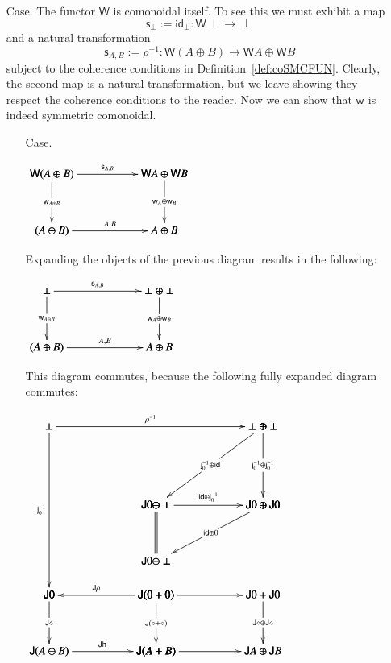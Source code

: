 \documentclass{lmcs}
\let\mto\to
\let\to\relax
\newcommand{\to}{\rightarrow}
\let\r\relax
\let\j\relax
\let\wn\relax
\let\H\relax
\newcommand{\func}[1]{\mathsf{#1}}
\newcommand{\H}[0]{\func{H}}
\newcommand{\J}[0]{\func{J}}
\newcommand{\id}[0]{\mathsf{id}}
\newcommand{\h}[1]{\mathsf{h}_{#1}}
\newcommand{\r}[1]{\mathsf{r}_{#1}}
\newcommand{\s}[1]{\mathsf{s}_{#1}}
\newcommand{\w}[1]{\mathsf{w}_{#1}}
\newcommand{\j}[1]{\mathsf{j}_{#1}}
\newcommand{\jinv}[1]{\mathsf{j}^{-1}_{#1}}
\newcommand{\wn}[0]{\mathop{?}}
\newenvironment{diagram}{
  \begin{center}
    \begin{math}
      \bfig
}{
      \efig
    \end{math}
  \end{center}
}
\begin{document}
\begin{itemize}
\item[Case.] The functor $\func{W}$ is comonoidal itself.  To see this we
  must exhibit a map
  \[\s{\perp} := \id_\perp : \func{W}\perp \mto \perp\]
  and a natural transformation
  \[\s{A,B} := \rho^{-1}_\perp : \func{W}(A \oplus B) \mto \func{W}A \oplus \func{W}B\]
  subject to the coherence conditions in
  Definition~\ref{def:coSMCFUN}.  Clearly, the second map is a natural
  transformation, but we leave showing they respect the coherence
  conditions to the reader.  Now we can show that $\w{}$ is indeed
  symmetric comonoidal.
  \begin{itemize}
  \item[Case.] \ \\
    \begin{diagram}
      \square|amma|<1000,500>[
        \func{W}(A \oplus B)`
        \func{W}A \oplus \func{W}B`
        \wn (A \oplus B)`
        \wn A \oplus \wn B;
        \s{A,B}`
        \w{A \oplus B}`
        \w{A} \oplus \w{B}`
        \r{A,B}]
    \end{diagram}
    Expanding the objects of the previous diagram results in the
    following:
    \begin{diagram}
      \square|amma|<1000,500>[
        \perp`
        \perp \oplus \perp`
        \wn (A \oplus B)`
        \wn A \oplus \wn B;
        \s{A,B}`
        \w{A \oplus B}`
        \w{A} \oplus \w{B}`
        \r{A,B}]
    \end{diagram}
    This diagram commutes, because the following fully expanded
    diagram commutes:
    \begin{diagram}
      \square|amma|/<-`->`->`->/<950,500>[
        \J 0`
        \J (0 + 0)`
        \J\H (A \oplus B)`
        \J (\H A + \H B);
        \J\rho`
        \J\diamond`
        \J (\diamond + \diamond)`
        \J\h{}]

      \square(950, 0)|amma|/->``->`->/<950,500>[
        \J (0 + 0)`
        \J 0 + \J 0`
        \J (\H A + \H B)`
        \J\H A \oplus \J\H B;
        \j{}``
        \J\diamond \oplus \J\diamond`
        \j{}]

      \square(0,500)/->`->``/<1900,1500>[
        \perp`
        \perp \oplus \perp`
        \J 0`;
        \rho^{-1}`
        \jinv{0}``]

      \dtriangle(950,1300)|mma|<950,700>[
        \perp \oplus \perp`
        \J 0 \oplus \perp`
        \J 0 \oplus \J 0;
        \jinv{0} \oplus \id`
        \jinv{0} \oplus \jinv{0}`
        \id \oplus \jinv{0}]

      \ptriangle(950,800)|amm|/`=`->/<950,500>[
        \J 0 \oplus \perp`
        \J 0 \oplus \J 0`
        \J 0 \oplus \perp;``
        \id \oplus \j{0}]


\end{diagram}
\end{itemize}
\end{itemize}
\end{document}
